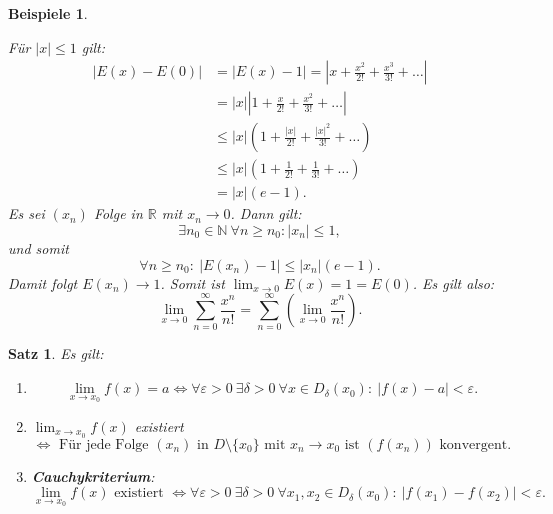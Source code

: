 \documentclass[12pt]{extreport} %
\newcommand{\N}{\mathbb{N}}
\newcommand{\R}{\mathbb{R}}
\theoremstyle{named}
\theoremstyle{itshape}
\newtheorem{satz}[unnamedtheorem]{Satz}
\theoremstyle{normal}
\newtheorem*{beispiele}{Beispiele}
\begin{document}
\begin{beispiele}
\begin{enumerate}
		        Für $|x| \leq 1$ gilt:
			\begin{align*}
				|E(x) - E(0)| & = |E(x) - 1| = |x + \frac{x^{2}}{2!} + \frac{x^{3}}{3!} + \dotsc | \\
				& = |x| \left| 1 + \frac{x}{2!} + \frac{x^{2}}{3!} + \dotsc \right| \\
				& \leq |x| \left( 1 + \frac{|x|}{2!} + \frac{|x|^{2}}{3!} + \dotsc \right) \\
				& \leq |x| \left( 1 + \frac{1}{2!} + \frac{1}{3!} + \dotsc \right) \\
				& = |x| ( e - 1 ).
			\end{align*}
			Es sei $(x_{n})$ Folge in $\R$ mit $x_{n} \rightarrow 0$. Dann gilt:
			$$
			\exists n_{0} \in \N~ \forall n \geq n_{0}: |x_{n}| \leq 1,
			$$
			und somit
			$$
			\forall n \geq n_{0}: ~ |E(x_{n}) - 1| \leq |x_{n}|(e-1).
			$$
			Damit folgt $E(x_{n}) \rightarrow 1$. Somit ist $\lim_{x \rightarrow 0} E(x) = 1 = E(0)$. Es gilt also:		
			$$
			\lim_{x \rightarrow 0} \sum_{n=0}^{\infty} \frac{x^{n}}{n!} = \sum_{n=0}^{\infty} \left( \lim_{x \rightarrow 0} \frac{x^{n}}{n!} \right).
			$$
	\end{enumerate}	
\end{beispiele}

\begin{satz} \label{6.2:satz} Es gilt:
        \begin{enumerate}
		\item 
		$$
		\lim_{x \rightarrow x_{0}} f(x) = a \iff \forall \varepsilon > 0 ~\exists \delta > 0 ~ \forall x \in D_{\delta}(x_{0}): ~|f(x)- a| < \varepsilon. 
		$$
		\label{6.2.a:satz}
		\item $\lim_{x \rightarrow x_{0}} f(x)$ existiert
			$$ \iff \text{ Für jede Folge } (x_{n}) \text{ in } D \setminus \{ x_{0} \} \text{ mit } x_{n} \rightarrow x_{0} \text{ ist } (f(x_{n})) \text{ konvergent}. $$ \label{6.2.b:satz} 
		\item \textbf{Cauchykriterium}: 
			$$ \lim_{x \rightarrow x_{0}} f(x) \text{ existiert } \iff \forall \varepsilon > 0 ~\exists \delta  > 0 ~\forall x_{1}, x_{2} \in D_{\delta}(x_{0}): ~ |f(x_{1}) - f(x_{2})| < \varepsilon. $$ \label{6.2.c:satz}
	\end{enumerate}
\end{satz}
\end{document}
